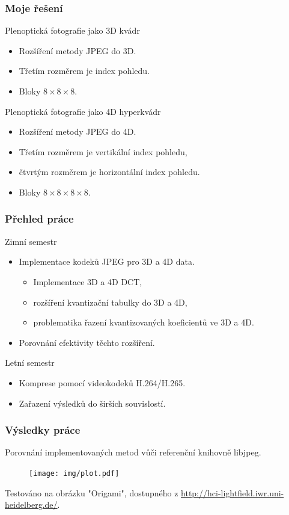 \documentclass[10pt,xcolor=pdflatex]{beamer}
\begin{document}
\begin{frame}\frametitle{Moje řešení}
  \begin{block}{Plenoptická fotografie jako 3D kvádr}
    \begin{itemize}
      \item Rozšíření metody JPEG do 3D.
      \item Třetím rozměrem je index pohledu.
      \item Bloky $8 \times 8 \times 8$.
    \end{itemize}
  \end{block}
  \begin{block}{Plenoptická fotografie jako 4D hyperkvádr}
    \begin{itemize}
      \item Rozšíření metody JPEG do 4D.
      \item Třetím rozměrem je vertikální index pohledu,
      \item čtvrtým rozměrem je horizontální index pohledu.
      \item Bloky $8 \times 8 \times 8 \times 8$.
    \end{itemize}
  \end{block}
\end{frame}

\begin{frame}\frametitle{Přehled práce}
  \begin{block}{Zimní semestr}
    \begin{itemize}
      \item{Implementace kodeků JPEG pro 3D a 4D data.}
      \begin{itemize}
        \item Implementace 3D a 4D DCT,
        \item rozšíření kvantizační tabulky do 3D a 4D,
        \item problematika řazení kvantizovaných koeficientů ve 3D a 4D.
      \end{itemize}
      \item Porovnání efektivity těchto rozšíření.
    \end{itemize}
  \end{block}
  \begin{block}{Letní semestr}
    \begin{itemize}
      \item Komprese pomocí videokodeků H.264/H.265.
      \item Zařazení výsledků do širších souvislostí.
    \end{itemize}
  \end{block}
\end{frame}

\begin{frame}\frametitle{Výsledky práce}
  Porovnání implementovaných metod vůči referenční knihovně libjpeg.
  \begin{figure}
    \texttt{[image: img/plot.pdf]}
  \end{figure}
  {
  \centering
  \small
  Testováno na obrázku "Origami", dostupného z \url{http://hci-lightfield.iwr.uni-heidelberg.de/}.
  }
\end{frame}
\end{document}
